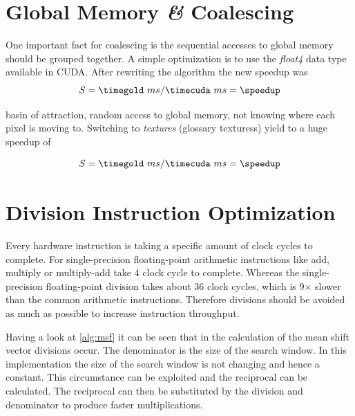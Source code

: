 \section*{Global Memory \textit{\&} Coalescing} 
\label{sec:coalescing}

One important fact for coalescing is the sequential accesses to global memory
should be grouped together. A simple optimization is to use the \emph{float4}
data type available in \gls{CUDA}. After rewriting the algorithm the new speedup
was 
\fpDiv{\speedup}{\timegold}{\timecuda}
\begin{equation*}\label{eq:speedup1}
	S = \timegold\ ms/\timecuda\ ms = \speedup
\end{equation*}

basin of attraction, random access to global memory, not knowing where each pixel
is moving to. Switching to \emph{textures} (glossary texturess) yield to a huge
speedup of 

\fpDiv{\speedup}{\timegold}{\timecuda}
\begin{equation*}\label{eq:speedup2}
	S = \timegold\ ms/\timecuda\ ms = \speedup
\end{equation*}


\section*{Division Instruction Optimization}
\label{sec:expensive_divisions}
Every hardware instruction is taking a specific amount of clock cycles to complete. 
For single-precision floating-point arithmetic instructions like add, multiply
or multiply-add take 4 clock cycle to complete. Whereas the single-precision
floating-point division takes about 36 clock cycles, which is 9$\times$ slower 
than the common arithmetic instructions. Therefore divisions should be avoided
as much as possible to increase instruction throughput. 


Having a look at \autoref{alg:msf} it can be seen that in the calculation of the
mean shift vector divisions occur. The denominator is the size of the search
window. In this implementation the size of the search window is not changing and
hence a constant. This circumstance can be exploited and the reciprocal can be
calculated. The reciprocal can then be substituted by the division and denominator
to produce faster multiplications.

